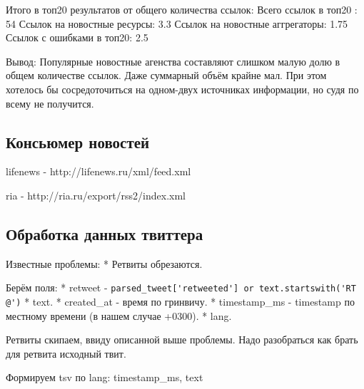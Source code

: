         Итого в топ20 результатов от общего количества ссылок:
        Всего ссылок в топ20 : 54%
        Ссылок на новостные ресурсы: 3.3%
        Ссылок на новостные аггрегаторы: 1.75%
        Ссылок с ошибками в топ20: 2.5%

        Вывод:
        Популярные новостные агенства составляют слишком малую долю в общем количестве ссылок. Даже суммарный объём крайне мал. При этом хотелось бы сосредоточиться на одном-двух источниках информации, но судя по всему не получится.


    \subsection{Консьюмер новостей}
        lifenews - http://lifenews.ru/xml/feed.xml

        ria - http://ria.ru/export/rss2/index.xml


    \subsection{Обработка данных твиттера}
        Известные проблемы: 
        * Ретвиты обрезаются.

        Берём поля:
        * retweet - \lstinline{parsed_tweet['retweeted'] or text.startswith('RT @')}
        * text.
        * created\_at - время по гринвичу.
        * timestamp\_ms - timestamp по местному времени (в нашем случае +0300).
        * lang.

        Ретвиты скипаем, ввиду описанной выше проблемы. Надо разобраться как брать для ретвита исходный твит.

        Формируем tsv по lang:
        timestamp\_ms, text

